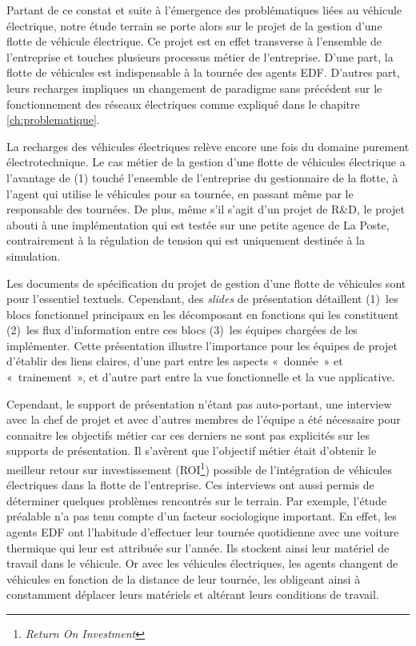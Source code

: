 Partant de ce constat et suite à l'émergence des problématiques liées au 
véhicule électrique, notre étude terrain se porte alors sur le projet de la 
gestion d'une flotte de véhicule électrique. Ce projet est en effet transverse à 
l'ensemble de l'entreprise et touches plusieurs processus métier de 
l'entreprise. D'une part, la flotte de véhicules est indispensable à la tournée 
des agents EDF. D'autres part, leurs recharges impliques un changement de 
paradigme sans précédent sur le fonctionnement des réseaux électriques comme 
expliqué dans le chapitre \ref{ch:problematique}.

La recharges des véhicules électriques relève encore une fois du domaine 
purement électrotechnique. Le cas métier de la gestion d'une flotte de véhicules 
électrique a l'avantage de (1) touché l'ensemble de l'entreprise du gestionnaire 
de la flotte, à l'agent qui utilise le véhicules pour sa tournée, en passant 
même par le responsable des tournées.
De plus, même s'il s'agit d'un projet de R\&D, le projet abouti à une 
implémentation qui est testée sur une petite agence de La Poste, contrairement à 
la régulation de tension qui est uniquement destinée à la simulation.

Les documents de spécification du projet de gestion d'une flotte de véhicules 
sont pour l'essentiel textuels. Cependant, des \textit{slides} de présentation 
détaillent (1)~les blocs fonctionnel principaux en les décomposant en fonctions 
qui les constituent (2)~les flux d'information entre ces blocs (3)~les équipes 
chargées de les implémenter. Cette présentation illustre l'importance pour les 
équipes  de projet d'établir des liens claires, d'une part entre les aspects 
«~donnée~» et «~trainement~», et d'autre part entre la vue fonctionnelle et la 
vue applicative.

Cependant, le support de présentation n'étant pas auto-portant, une interview 
avec la chef de projet et avec d'autres membres de l'équipe a été nécessaire 
pour connaitre les objectifs métier car ces derniers ne sont pas explicités sur 
les supports de présentation. Il s'avèrent que l'objectif métier était d'obtenir 
le meilleur retour sur investissement (ROI\footnote{\textit{Return On 
Investment}}) possible de l'intégration de véhicules électriques dans la flotte 
de l'entreprise. Ces interviews ont aussi permis de déterminer quelques 
problèmes rencontrés sur le terrain. Par exemple, l'étude préalable n'a pas tenu 
compte d'un facteur sociologique important. En effet, les agents EDF ont 
l'habitude d'effectuer leur tournée quotidienne avec une voiture thermique qui 
leur est attribuée sur l'année. Ils stockent ainsi leur matériel de travail dans 
le véhicule. Or avec les véhicules électriques, les agents changent de véhicules 
en fonction de la distance de leur tournée, les obligeant ainsi à constamment 
déplacer leurs matériels et altérant leurs conditions de travail.   

